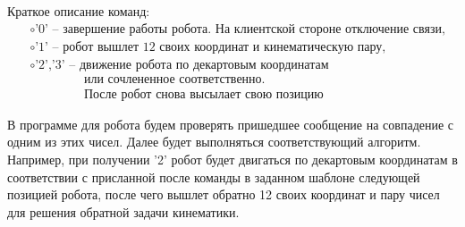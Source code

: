 \documentclass[a4paper,14pt]{extarticle}
\begin{document}
Краткое описание команд:
\begin{align*}
    &\circ\text{'0' -- завершение работы робота. На клиентской стороне отключение связи,}\\
    &\circ\text{'1' -- робот вышлет 12 своих координат и кинематическую пару,}\\
    &\circ\text{'2','3' -- движение робота по декартовым координатам}\\
    &\,\,\,\,\,\,\,\,\,\,\,\,\,\,\,\,\,\,\,\,\,\,\,\,\,\,\text{или сочлененное соответственно.}\\
    &\,\,\,\,\,\,\,\,\,\,\,\,\,\,\,\,\,\,\,\,\,\,\,\,\,\,\text{После робот снова высылает свою позицию}
\end{align*}


В программе для робота будем проверять пришедшее сообщение
на совпадение с одним из этих чисел. Далее будет
выполняться соответствующий алгоритм. Например, при получении
'2' робот будет двигаться по декартовым координатам в соответствии
с присланной после команды в заданном шаблоне следующей позицией робота, после чего
вышлет обратно 12 своих координат и пару чисел для решения
обратной задачи кинематики.







\end{document}
